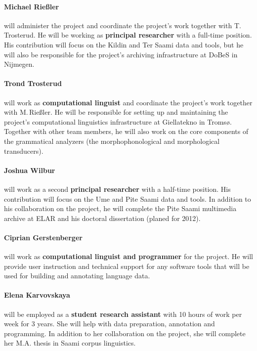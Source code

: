 \documentclass[a4paper,12pt]{article}
\begin{document}
{{\paragraph{Michael Rießler} will administer the project and coordinate the project's work together with T.\,Trosterud. He will be working as {\bf principal researcher} with a full-time position. His contribution will focus on the Kildin and Ter Saami data and tools, but he will also be responsible for the project's archiving infrastructure at DoBeS in Nijmegen.

\paragraph{Trond Trosterud} will work as {\bf computational linguist} and coordinate the project's work together with M.\,Rießler. He will be responsible for setting up and maintaining the project's computational linguistics infrastructure at Giellatekno in Tromsø. Together with other team members, he will also work on the core components of the grammatical analyzers (the morphophonological and morphological transducers).

\paragraph{Joshua Wilbur} will work as a second {\bf principal researcher} with a half-time position. His contribution will focus on the Ume and Pite Saami data and tools. In addition to his collaboration on the project, he will complete the Pite Saami multimedia archive at ELAR and his doctoral dissertation (planed for 2012).

\paragraph{Ciprian Gerstenberger} will work as {\bf computational linguist and programmer} for the project. He will provide user instruction and technical support for any software tools that will be used for building and annotating language data. 

\paragraph{Elena Karvovskaya} will be employed as a \textbf{student research assistant} with 10 hours of work per week for 3 years. She will help with data preparation, annotation and programming. In addition to her collaboration on the project, she will complete her M.A. thesis in Saami corpus linguistics.

}}
\end{document}
